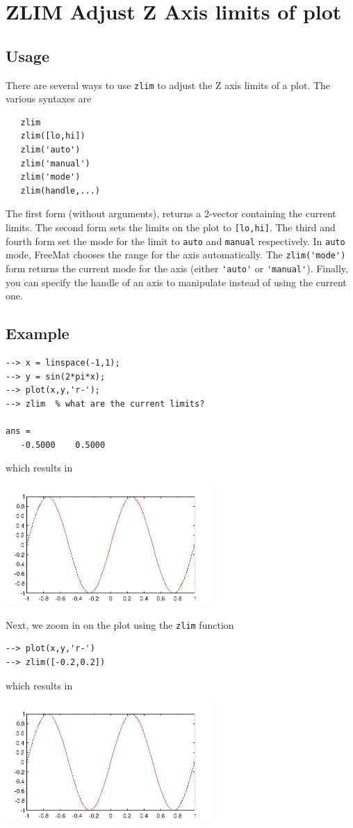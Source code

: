 \section{ZLIM Adjust Z Axis limits of plot}

\subsection{Usage}

There are several ways to use \verb|zlim| to adjust the Z axis limits of
a plot.  The various syntaxes are
\begin{verbatim}
   zlim
   zlim([lo,hi])   
   zlim('auto')
   zlim('manual')
   zlim('mode')
   zlim(handle,...)
\end{verbatim}
The first form (without arguments), returns a 2-vector containing the
current limits.  The second form sets the limits on the plot to \verb|[lo,hi]|.
The third and fourth form set the mode for the limit to \verb|auto| and \verb|manual|
respectively.  In \verb|auto| mode, FreeMat chooses the range for the axis 
automatically.  The \verb|zlim('mode')| form returns the current mode for the axis
(either \verb|'auto'| or \verb|'manual'|).  Finally, you can specify the handle of an
axis to manipulate instead of using the current one.
\subsection{Example}

\begin{verbatim}
--> x = linspace(-1,1);
--> y = sin(2*pi*x);
--> plot(x,y,'r-');
--> zlim  % what are the current limits?

ans = 
   -0.5000    0.5000 
\end{verbatim}
which results in


\centerline{\includegraphics[width=8cm]{zlim1}}

Next, we zoom in on the plot using the \verb|zlim| function
\begin{verbatim}
--> plot(x,y,'r-')
--> zlim([-0.2,0.2])
\end{verbatim}
which results in


\centerline{\includegraphics[width=8cm]{zlim2}}


